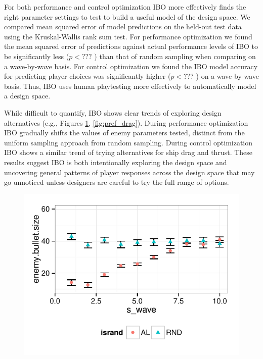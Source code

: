 \documentclass[letterpaper]{article}
\begin{document}
For both performance and control optimization IBO more effectively finds the right parameter settings to test to build a useful model of the design space.
We compared mean squared error of model predictions on the held-out test data using the Kruskal-Wallis rank sum test.
For performance optimization we found the mean squared error of predictions against actual performance levels of IBO to be significantly less ($p<???$ ) than that of random sampling when comparing on a wave-by-wave basis. 
For control optimization we found the IBO model accuracy for predicting player choices was significantly higher ($p<???$ ) on a wave-by-wave basis. Thus, IBO uses human playtesting more effectively to automatically model a design space.

While difficult to quantify, IBO shows clear trends of exploring design alternatives (e.g., Figures \ref{fig:reg_bulletsize}, \ref{fig:pref_drag}). During performance optimization IBO gradually shifts the values of enemy parameters tested, distinct from the uniform sampling approach from random sampling. During control optimization IBO shows a similar trend of trying alternatives for ship drag and thrust. These results suggest IBO is both intentionally exploring the design space and uncovering general patterns of player responses across the design space that may go unnoticed unless designers are careful to try the full range of options.

\begin{figure}[tbph]
\centering
\includegraphics[width=\linewidth]{reg_bulletsize}
\caption{}
\label{fig:reg_bulletsize}
\end{figure}
\end{document}
